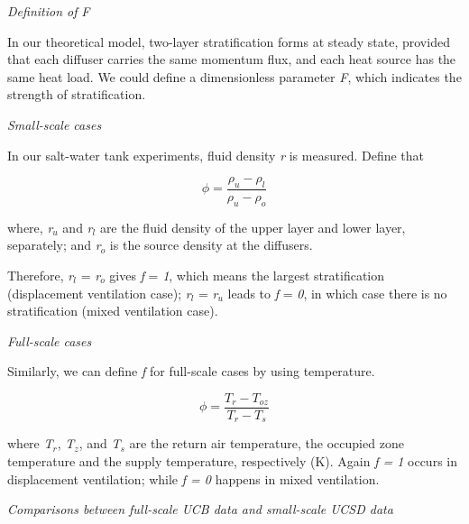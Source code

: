 \emph{Definition of} \emph{F}

In our theoretical model, two-layer stratification forms at steady state, provided that each diffuser carries the same momentum flux, and each heat source has the same heat load. We could define a dimensionless parameter \emph{F}, which indicates the strength of stratification.

\emph{Small-scale cases}

In our salt-water tank experiments, fluid density \emph{r} is measured. Define that

\begin{equation}
\phi  = \frac{{{\rho_u} - {\rho_l}}}{{{\rho_u} - {\rho_o}}}
\end{equation}

where, \emph{r\(_{u}\)} and \emph{r\(_{l}\)} are the fluid density of the upper layer and lower layer, separately; and \emph{r\(_{o}\)} is the source density at the diffusers.

Therefore, \emph{r\(_{l}\)} = \emph{r\(_{o}\)} gives \emph{f} = \emph{1}, which means the largest stratification (displacement ventilation case); \emph{r\(_{l}\)} = \emph{r\(_{u}\)} leads to \emph{f} = \emph{0}, in which case there is no stratification (mixed ventilation case).

\emph{Full-scale cases}

Similarly, we can define \emph{f} for full-scale cases by using temperature.

\begin{equation}
\phi  = \frac{{{T_r} - {T_{oz}}}}{{{T_r} - {T_s}}}
\end{equation}

where \emph{T\(_{r}\)}, \emph{T\(_{z}\)}, and \emph{T\(_{s}\)} are the return air temperature, the occupied zone temperature and the supply temperature, respectively (K). Again \emph{f = 1} occurs in displacement ventilation; while \emph{f = 0} happens in mixed ventilation.

\emph{Comparisons between full-scale UCB data and small-scale UCSD data}

